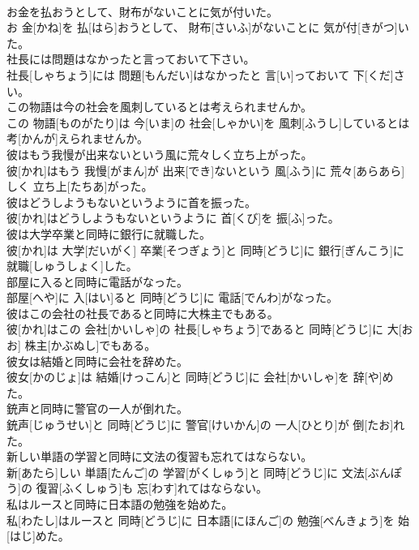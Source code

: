 \documentclass[8pt]{extreport}
\begin{document}
\begin{CJK}{UTF8}{min}
\\	お金を払おうとして、財布がないことに気が付いた。	
\\	お 金[かね]を 払[はら]おうとして、 財布[さいふ]がないことに 気が付[きがつ]いた。
\\	社長には問題はなかったと言っておいて下さい。	
\\	社長[しゃちょう]には 問題[もんだい]はなかったと 言[い]っておいて 下[くだ]さい。
\\	この物語は今の社会を風刺しているとは考えられませんか。	
\\	この 物語[ものがたり]は 今[いま]の 社会[しゃかい]を 風刺[ふうし]しているとは 考[かんが]えられませんか。
\\	彼はもう我慢が出来ないという風に荒々しく立ち上がった。	
\\	彼[かれ]はもう 我慢[がまん]が 出来[でき]ないという 風[ふう]に 荒々[あらあら]しく 立ち上[たちあ]がった。
\\	彼はどうしようもないというように首を振った。	
\\	彼[かれ]はどうしようもないというように 首[くび]を 振[ふ]った。
\\	彼は大学卒業と同時に銀行に就職した。	
\\	彼[かれ]は 大学[だいがく] 卒業[そつぎょう]と 同時[どうじ]に 銀行[ぎんこう]に 就職[しゅうしょく]した。
\\	部屋に入ると同時に電話がなった。	
\\	部屋[へや]に 入[はい]ると 同時[どうじ]に 電話[でんわ]がなった。
\\	彼はこの会社の社長であると同時に大株主でもある。	
\\	彼[かれ]はこの 会社[かいしゃ]の 社長[しゃちょう]であると 同時[どうじ]に 大[おお] 株主[かぶぬし]でもある。
\\	彼女は結婚と同時に会社を辞めた。	
\\	彼女[かのじょ]は 結婚[けっこん]と 同時[どうじ]に 会社[かいしゃ]を 辞[や]めた。
\\	銃声と同時に警官の一人が倒れた。	
\\	銃声[じゅうせい]と 同時[どうじ]に 警官[けいかん]の 一人[ひとり]が 倒[たお]れた。
\\	新しい単語の学習と同時に文法の復習も忘れてはならない。	
\\	新[あたら]しい 単語[たんご]の 学習[がくしゅう]と 同時[どうじ]に 文法[ぶんぽう]の 復習[ふくしゅう]も 忘[わす]れてはならない。
\\	私はルースと同時に日本語の勉強を始めた。	
\\	私[わたし]はルースと 同時[どうじ]に 日本語[にほんご]の 勉強[べんきょう]を 始[はじ]めた。

\end{CJK}
\end{document}
